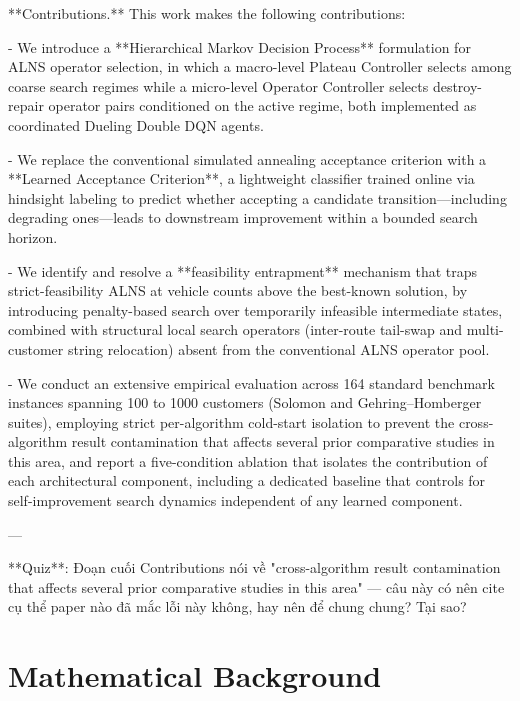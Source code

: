 \documentclass[conference]{IEEEtran}
\begin{document}
**Contributions.** This work makes the following contributions:

- We introduce a **Hierarchical Markov Decision Process** formulation for ALNS operator selection, in which a macro-level Plateau Controller selects among coarse search regimes while a micro-level Operator Controller selects destroy-repair operator pairs conditioned on the active regime, both implemented as coordinated Dueling Double DQN agents.

- We replace the conventional simulated annealing acceptance criterion with a **Learned Acceptance Criterion**, a lightweight classifier trained online via hindsight labeling to predict whether accepting a candidate transition—including degrading ones—leads to downstream improvement within a bounded search horizon.

- We identify and resolve a **feasibility entrapment** mechanism that traps strict-feasibility ALNS at vehicle counts above the best-known solution, by introducing penalty-based search over temporarily infeasible intermediate states, combined with structural local search operators (inter-route tail-swap and multi-customer string relocation) absent from the conventional ALNS operator pool.

- We conduct an extensive empirical evaluation across 164 standard benchmark instances spanning 100 to 1000 customers (Solomon and Gehring–Homberger suites), employing strict per-algorithm cold-start isolation to prevent the cross-algorithm result contamination that affects several prior comparative studies in this area, and report a five-condition ablation that isolates the contribution of each architectural component, including a dedicated baseline that controls for self-improvement search dynamics independent of any learned component.

---

**Quiz**: Đoạn cuối Contributions nói về "cross-algorithm result contamination that affects several prior comparative studies in this area" — câu này có nên cite cụ thể paper nào đã mắc lỗi này không, hay nên để chung chung? Tại sao?









\section{Mathematical Background}
\label{sec:background}
\end{document}
